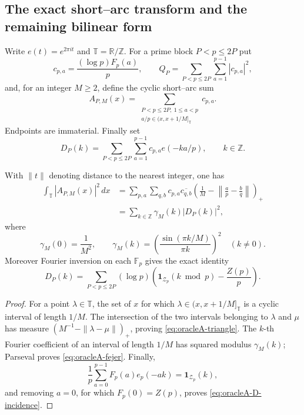
\subsection{The exact short--arc transform and the remaining bilinear form}
\label{ssec:oracleA-result}

Write $e(t)=e^{2\pi i t}$ and $\mathbb T=\mathbb R/\mathbb Z$.  For a
prime block $P<p\leq2P$ put
\[
 c_{p,a}=\frac{(\log p)F_p(a)}p,
 \qquad
 Q_P=\sum_{P<p\leq2P}\sum_{a=1}^{p-1}|c_{p,a}|^2,
\]
and, for an integer $M\geq2$, define the cyclic short--arc sum
\[
 A_{P,M}(x)=
 \sum_{\substack{P<p\leq2P,\ 1\leq a<p\\
             a/p\in(x,x+1/M]_{\mathbb T}}}c_{p,a}.
\]
Endpoints are immaterial.  Finally set
\[
 D_P(k)=\sum_{P<p\leq2P}\sum_{a=1}^{p-1}
          c_{p,a}e(-ka/p),\qquad k\in\mathbb Z.
\]

\begin{proposition}
\label{prop:oracleA-triangle}
With $\|t\|$ denoting distance to the nearest integer, one has
\begin{align}
 \int_{\mathbb T}|A_{P,M}(x)|^2\,dx
 &=\sum_{p,a}\sum_{q,b}c_{p,a}\overline{c_{q,b}}
   \left(\frac1M-\left\|\frac ap-\frac bq\right\|\right)_+
 \label{eq:oracleA-triangle}\\
 &=\sum_{k\in\mathbb Z}\gamma_M(k)|D_P(k)|^2,
 \label{eq:oracleA-fejer}
\end{align}
where
\[
 \gamma_M(0)=\frac1{M^2},\qquad
 \gamma_M(k)=\left(\frac{\sin(\pi k/M)}{\pi k}\right)^2
 \quad(k\ne0).
\]
Moreover Fourier inversion on each $\mathbb F_p$ gives the exact identity
\begin{equation}
 D_P(k)=\sum_{P<p\leq2P}(\log p)
 \left(\mathbf1_{\mathcal Z_p}(k\bmod p)-\frac{Z(p)}p\right).
 \label{eq:oracleA-D-incidence}
\end{equation}
\end{proposition}

\begin{proof}
For a point $\lambda\in\mathbb T$, the set of $x$ for which
$\lambda\in(x,x+1/M]_{\mathbb T}$ is a cyclic interval of length $1/M$.
The intersection of the two intervals belonging to $\lambda$ and $\mu$
has measure $(M^{-1}-\|\lambda-\mu\|)_+$, proving
\eqref{eq:oracleA-triangle}.  The $k$-th Fourier coefficient of an interval
of length $1/M$ has squared modulus $\gamma_M(k)$; Parseval proves
\eqref{eq:oracleA-fejer}.  Finally,
\[
 \frac1p\sum_{a=0}^{p-1}F_p(a)e_p(-ak)
 =\mathbf1_{\mathcal Z_p}(k),
\]
and removing $a=0$, for which $F_p(0)=Z(p)$, proves
\eqref{eq:oracleA-D-incidence}.
\end{proof}

